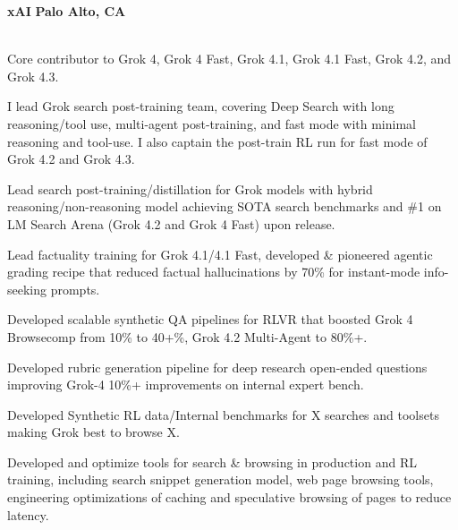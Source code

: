 \documentclass[10pt,letterpaper]{article}
\begin{document}
\noindent\textbf{xAI} \hfill \textbf{Palo Alto, CA}\\
\\
\vspace{-10pt}
\begin{rbullets}\small
\item Core contributor to Grok 4, Grok 4 Fast, Grok 4.1, Grok 4.1 Fast, Grok 4.2, and Grok 4.3.
\item I lead Grok search post-training team, covering Deep Search with long reasoning/tool use, multi-agent post-training, and fast mode with minimal reasoning and tool-use. I also captain the post-train RL run for fast mode of Grok 4.2 and Grok 4.3.
\item Lead search post-training/distillation for Grok models with hybrid reasoning/non-reasoning model achieving SOTA search benchmarks and \#1 on LM Search Arena (Grok 4.2 and Grok 4 Fast) upon release.
\item Lead factuality training for Grok 4.1/4.1 Fast, developed \& pioneered agentic grading recipe that reduced factual hallucinations by 70\% for instant-mode info-seeking prompts.
\item Developed scalable synthetic QA pipelines for RLVR that boosted Grok 4 Browsecomp from 10\% to 40+\%, Grok 4.2 Multi-Agent to 80\%+.
\item Developed rubric generation pipeline for deep research open-ended questions improving Grok-4 10\%+ improvements on internal expert bench.
\item Developed Synthetic RL data/Internal benchmarks for X searches and toolsets making Grok best to browse X.
\item Developed and optimize tools for search \& browsing in production and RL training, including search snippet generation model, web page browsing tools, engineering optimizations of caching and speculative browsing of pages to reduce latency.
\end{rbullets}
\end{document}
